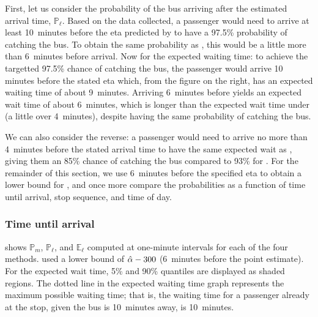 First, let us consider the probability of the bus arriving after the estimated arrival time, $\mathbb{P}_\ell$. Based on the data collected, a passenger would need to arrive at least 10~minutes before the \gls{eta} predicted by \Fsched{} to have a 97.5\% probability of catching the bus. To obtain the same probability as \Fpf{}, this would be a little more than 6~minutes before arrival. Now for the expected waiting time: to achieve the targetted 97.5\% chance of catching the bus, the passenger would arrive 10 minutes before the stated \gls{eta} which, from the figure on the right, has an expected waiting time of about 9~minutes. Arriving 6~minutes before yields an expected wait time of about 6~minutes, which is longer than the expected wait time under \Fpf{} (a little over 4~minutes), despite having the same probability of catching the bus.


We can also consider the reverse: a passenger would need to arrive no more than 4~minutes before the stated arrival time to have the same expected wait as \Fpf{}, giving them an 85\% chance of catching the bus compared to 93\% for \Fpf{}. For the remainder of this section, we use 6~minutes before the specified \gls{eta} to obtain a lower bound for \Fsched{}, and once more compare the probabilities as a function of time until arrival, stop sequence, and time of day.



\subsubsection{Time until arrival}

 shows $\mathbb{P}_m$, $\mathbb{P}_\ell$, and $\mathbb{E}_\ell$ computed at one-minute intervals for each of the four methods. \Fsched{} used a lower bound of $\hat{\alpha} - 300$ (6~minutes before the point estimate). For the expected wait time, 5\% and 90\% quantiles are displayed as shaded regions. The dotted line in the expected waiting time graph represents the maximum possible waiting time; that is, the waiting time for a passenger already at the stop, given the bus is 10~minutes away, is 10~minutes.


